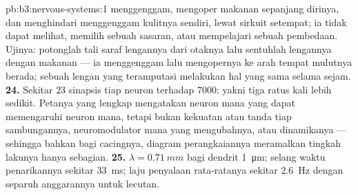 \begin{solution}{pb:b3:nervous-systems:1}
menggenggam, mengoper makanan sepanjang dirinya, dan menghindari menggenggam kulitnya sendiri, lewat
sirkuit setempat; ia tidak dapat melihat, memilih sebuah sasaran, atau mempelajari sebuah pembedaan.
Ujinya: potonglah tali saraf lengannya dari otaknya lalu sentuhlah lengannya dengan
makanan --- ia menggenggam lalu mengopernya ke arah tempat mulutnya berada; sebuah
lengan yang teramputasi melakukan hal yang sama selama sejam.
\textbf{24.} Sekitar $23$ sinapsis tiap neuron terhadap $7000$: yakni tiga ratus
kali lebih sedikit. Petanya yang lengkap mengatakan neuron mana yang dapat memengaruhi neuron mana,
tetapi bukan kekuatan atau tanda tiap sambungannya, neuromodulator mana yang
mengubahnya, atau dinamikanya --- sehingga bahkan bagi cacingnya, diagram
perangkaiannya meramalkan tingkah lakunya hanya sebagian.
\textbf{25.} $\lambda = \qty{0.71}{mm}$ bagi dendrit \qty{1}{\micro m};
selang waktu penarikannya sekitar \qty{33}{ms}; laju penyalaan rata-ratanya
sekitar \qty{2.6}{Hz} dengan separuh anggarannya untuk lecutan.
\end{solution}
